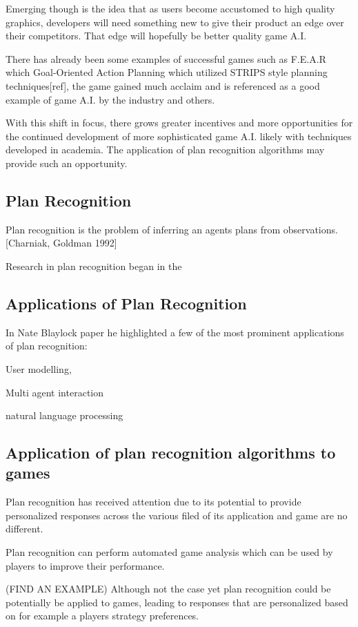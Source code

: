 \documentclass[parskip]{cs4rep}
\begin{document}
Emerging though is the idea that as users become accustomed to high quality graphics, developers will need something new to give their product an edge over their competitors. That edge will hopefully be better quality game A.I.

There has already been some examples of successful games such as F.E.A.R which Goal-Oriented Action Planning which utilized STRIPS style planning techniques[ref], the game gained much acclaim and is referenced as a good example of game A.I. by the industry and others.

With this shift in focus, there grows greater incentives and more opportunities for the continued development of more sophisticated game A.I. likely with techniques developed in academia. The application of plan recognition algorithms may provide such an opportunity. 

\subsection{Plan Recognition}

Plan recognition is the problem of inferring an agents plans from observations. [Charniak, Goldman 1992]

Research in plan recognition began in the 

\subsection{Applications of Plan Recognition}

In Nate Blaylock paper he highlighted a few of the most prominent applications of plan recognition:

User modelling, 

Multi agent interaction 

natural language processing

\subsection{Application of plan recognition algorithms to games}

Plan recognition has received attention due to its potential to provide personalized responses across the various filed of its application and game are no different.

Plan recognition can perform automated game analysis which can be used by players to improve their performance. 

(FIND AN EXAMPLE) Although not the case yet plan recognition could be potentially be applied to games, leading to responses that are personalized based on for example a players strategy preferences.
\end{document}
